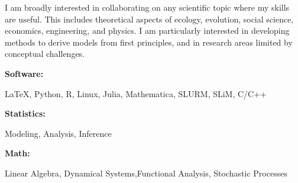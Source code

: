 \documentclass[9pt]{developercv} %
\begin{document}

\begin{minipage}[t]{0.46\textwidth}
	\vspace{-6pt}

	I am broadly interested in collaborating on any scientific topic where my skills are useful. This includes theoretical aspects of ecology, evolution, social science, economics, engineering, and physics. I am particularly interested in developing methods to derive models from first principles, and in research areas limited by conceptual challenges. \\

\end{minipage}
\hfill %
\begin{minipage}[t]{0.465\textwidth}
    \vspace{-6pt}
    
    \begin{minipage}[t]{0.2\textwidth}
        \textbf{Software:}
    \end{minipage}
    \hfill
    \begin{minipage}[t]{0.75\textwidth}
      \LaTeX, Python, R, Linux, Julia, Mathematica, SLURM, SLiM, C/C++
    \end{minipage}
    \vspace{4mm}

    \vspace{-5 pt}
    \begin{minipage}[t]{0.2\textwidth}
        \textbf{Statistics:}
    \end{minipage}
    \hfill
    \begin{minipage}[t]{0.75\textwidth}
      Modeling, Analysis, Inference
    \end{minipage}
    \vspace{4mm}

    \vspace{-5 pt}
    \begin{minipage}[t]{0.2\textwidth}
        \textbf{Math:}
    \end{minipage}
    \hfill
    \begin{minipage}[t]{0.75\textwidth}
      Linear Algebra, Dynamical Systems,\newline Functional Analysis, Stochastic Processes
    \end{minipage}

\end{minipage}

\end{document}
